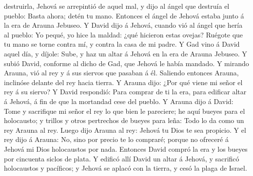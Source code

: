 destruirla, Jehová se arrepintió de aquel mal, y dijo al ángel que
destruía el pueblo: Basta ahora; detén tu mano. Entonces el ángel de
Jehová estaba junto á la era de Arauna Jebuseo.  Y David
dijo á Jehová, cuando vió al ángel que hería al pueblo: Yo pequé, yo
hice la maldad: ¿qué hicieron estas ovejas? Ruégote que tu mano se torne
contra mí, y contra la casa de mi padre.  Y Gad vino á
David aquel día, y díjole: Sube, y haz un altar á Jehová en la era de
Arauna Jebuseo.  Y subió David, conforme al dicho de Gad,
que Jehová le había mandado.  Y mirando Arauna, vió al
rey y á sus siervos que pasaban á él. Saliendo entonces Arauna,
inclinóse delante del rey hacia tierra.  Y Arauna dijo:
¿Por qué viene mi señor el rey á su siervo? Y David respondió: Para
comprar de ti la era, para edificar altar á Jehová, á fin de que la
mortandad cese del pueblo.  Y Arauna dijo á David: Tome y
sacrifique mi señor el rey lo que bien le pareciere; he aquí bueyes para
el holocausto; y trillos y otros pertrechos de bueyes para leña:
 Todo lo da como un rey Arauna al rey. Luego dijo Arauna
al rey: Jehová tu Dios te sea propicio.  Y el rey dijo á
Arauna: No, sino por precio te lo compraré; porque no ofreceré á Jehová
mi Dios holocaustos por nada. Entonces David compró la era y los bueyes
por cincuenta siclos de plata.  Y edificó allí David un
altar á Jehová, y sacrificó holocaustos y pacíficos; y Jehová se aplacó
con la tierra, y cesó la plaga de Israel.
